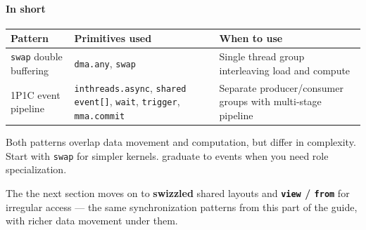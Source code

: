 \paragraph*{In short}

\begin{table}[htbp]
\centering\small
\begin{tabularx}{\linewidth}{@{}lXX@{}}
\toprule
\textbf{Pattern} & \textbf{Primitives used} & \textbf{When to use} \\
\midrule
\texttt{swap} double buffering & \texttt{dma.any}, \texttt{swap} & Single thread group interleaving load and compute \\
1P1C event pipeline & \texttt{inthreads.\allowbreak{}async}, \texttt{shared event[]}, \texttt{wait}, \texttt{trigger}, \texttt{mma.commit} & Separate producer/consumer groups with multi-stage pipeline \\
\bottomrule
\end{tabularx}
\end{table}

Both patterns overlap data movement and computation, but differ in complexity. Start with \texttt{swap} for simpler kernels. graduate to events when you need role specialization.

The the next section moves on to \textbf{swizzled} shared layouts and \textbf{\texttt{view} / \texttt{from}} for irregular access --- the same synchronization patterns from this part of the guide, with richer data movement under them.
